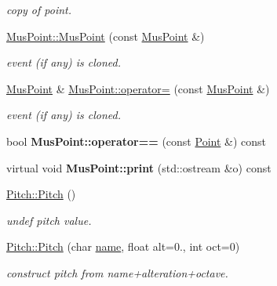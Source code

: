 \begin{DoxyCompactItemize}
\begin{DoxyCompactList}\small\item\em copy of point. \end{DoxyCompactList}\item 
\mbox{\label{group__segment_ga5f00500846d251b165f48a41552be18e}} 
\mbox{\hyperlink{group__segment_ga5f00500846d251b165f48a41552be18e}{Mus\+Point\+::\+Mus\+Point}} (const \mbox{\hyperlink{classMusPoint}{Mus\+Point}} \&)
\begin{DoxyCompactList}\small\item\em event (if any) is cloned. \end{DoxyCompactList}\item 
\mbox{\label{group__segment_ga522126acc9eb79e737068941370bb172}} 
\mbox{\hyperlink{classMusPoint}{Mus\+Point}} \& \mbox{\hyperlink{group__segment_ga522126acc9eb79e737068941370bb172}{Mus\+Point\+::operator=}} (const \mbox{\hyperlink{classMusPoint}{Mus\+Point}} \&)
\begin{DoxyCompactList}\small\item\em event (if any) is cloned. \end{DoxyCompactList}\item 
\mbox{\label{group__segment_ga07139fb89dcc2388b299b9e6464b3177}} 
bool {\bfseries Mus\+Point\+::operator==} (const \mbox{\hyperlink{classPoint}{Point}} \&) const
\item 
\mbox{\label{group__segment_gafef7a93b7ba8e96efc8d2b179c69a830}} 
virtual void {\bfseries Mus\+Point\+::print} (std\+::ostream \&o) const
\item 
\mbox{\label{group__segment_ga09a5f5040f1902afa6d81520cf7bd084}} 
\mbox{\hyperlink{group__segment_ga09a5f5040f1902afa6d81520cf7bd084}{Pitch\+::\+Pitch}} ()
\begin{DoxyCompactList}\small\item\em undef pitch value. \end{DoxyCompactList}\item 
\mbox{\hyperlink{group__segment_gaf3f9d88915bb6688d522f09d7542f690}{Pitch\+::\+Pitch}} (char \mbox{\hyperlink{classPitch_a7a7649ed78c05c1ff5f77c69155f1a71}{name}}, float alt=0., int oct=0)
\begin{DoxyCompactList}\small\item\em construct pitch from name+alteration+octave. \end{DoxyCompactList}\item 

\end{DoxyCompactItemize}
